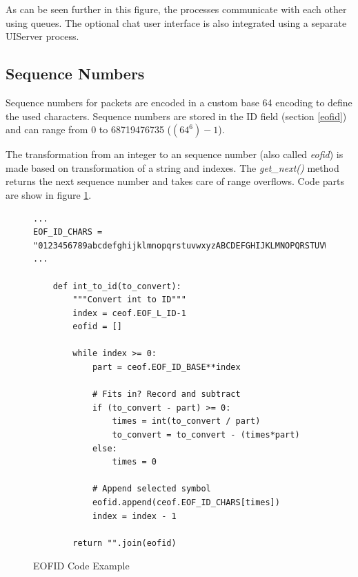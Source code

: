 As can be seen further in this figure, the processes communicate with
each other using queues. The optional chat user interface is also
integrated using a separate UIServer process.
\subsection{Sequence Numbers}
Sequence numbers for packets are encoded in a custom base 64 encoding to
define the used characters. Sequence numbers are stored in the
ID field (section \ref{eofid}) and can range from 0 to 68719476735 ($(64^6)-1$).

The transformation from an integer to an sequence 
number (also called \textit{eofid}) is made based on transformation
of a string and indexes. The \textit{get\_next()} method returns
the next sequence number and takes care of range overflows.
Code parts are show in figure \ref{eofidexample}.
\begin{figure}[htbp]
\caption{EOFID Code Example}
\label{eofidexample}
\begin{verbatim}
...
EOF_ID_CHARS = "0123456789abcdefghijklmnopqrstuvwxyzABCDEFGHIJKLMNOPQRSTUVWXYZ-!"
...

    def int_to_id(to_convert):
        """Convert int to ID"""
        index = ceof.EOF_L_ID-1
        eofid = []

        while index >= 0:
            part = ceof.EOF_ID_BASE**index

            # Fits in? Record and subtract
            if (to_convert - part) >= 0:
                times = int(to_convert / part)
                to_convert = to_convert - (times*part)
            else:
                times = 0 

            # Append selected symbol
            eofid.append(ceof.EOF_ID_CHARS[times])
            index = index - 1 

        return "".join(eofid)
\end{verbatim}
\end{figure}
